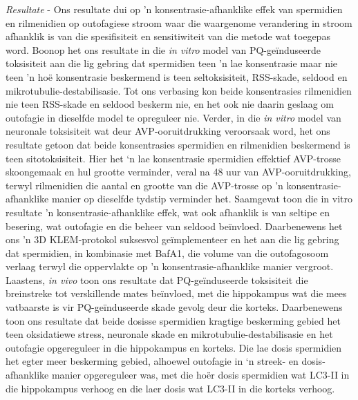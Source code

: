 \textit{Resultate} - Ons resultate dui op 'n konsentrasie-afhanklike effek van spermidien en rilmenidien op outofagiese stroom waar die waargenome verandering in stroom afhanklik is van die spesifisiteit en sensitiwiteit van die metode wat toegepas word. Boonop het ons resultate in die \textit{in vitro} model van PQ-ge{\"i}nduseerde toksisiteit aan die lig gebring dat spermidien teen 'n lae konsentrasie maar nie teen 'n ho{\"e} konsentrasie beskermend is teen seltoksisiteit, RSS-skade, seldood en mikrotubulie-destabilisasie. Tot ons verbasing kon beide konsentrasies rilmenidien nie teen RSS-skade en seldood beskerm nie, en het ook nie daarin geslaag om outofagie in dieselfde model te opreguleer nie. Verder, in die \textit{in vitro} model van neuronale toksisiteit wat deur AVP-ooruitdrukking veroorsaak word, het ons resultate getoon dat beide konsentrasies spermidien en rilmenidien beskermend is teen sitotoksisiteit. Hier het ‘n lae konsentrasie spermidien effektief AVP-trosse skoongemaak en hul grootte verminder, veral na 48 uur van AVP-ooruitdrukking, terwyl rilmenidien die aantal en grootte van die AVP-trosse op 'n konsentrasie-afhanklike manier op dieselfde tydstip verminder het. Saamgevat toon die in vitro resultate 'n konsentrasie-afhanklike effek, wat ook afhanklik is van seltipe en besering, wat outofagie en die beheer van seldood be{\"i}nvloed. Daarbenewens het ons 'n 3D KLEM-protokol suksesvol ge{\"i}mplementeer en het aan die lig gebring dat spermidien, in kombinasie met BafA1, die volume van die outofagosoom verlaag terwyl die oppervlakte op 'n konsentrasie-afhanklike manier vergroot. Laastens, \textit{in vivo} toon ons resultate dat PQ-ge{\"i}nduseerde toksisiteit die breinstreke tot verskillende mates be{\"i}nvloed, met die hippokampus wat die mees vatbaarste is vir PQ-ge{\"i}nduseerde skade gevolg deur die korteks. Daarbenewens toon ons resultate dat beide dosisse spermidien kragtige beskerming gebied het teen oksidatiewe stress, neuronale skade en mikrotubulie-destabilisasie en het outofagie opgereguleer in die hippokampus en korteks. Die lae dosis spermidien het egter meer beskerming gebied, alhoewel outofagie in ‘n streek- en dosis-afhanklike manier opgereguleer was, met die ho{\"e}r dosis spermidien wat LC3-II in die hippokampus verhoog en die laer dosis wat LC3-II in die korteks verhoog.

